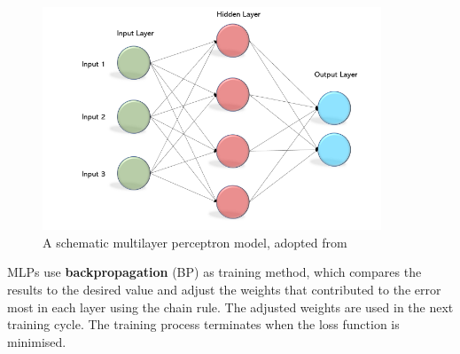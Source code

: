 \documentclass[nobib]{tufte-handout}
\begin{document}
\begin{figure}[h!]
\centering
  \includegraphics[width=0.9\textwidth]{mlp3.png}
  \caption{A schematic multilayer perceptron model, adopted from \cite{becominghuman:MLP}}
  \label{fig:mlp}
\end{figure}
\newpage
MLPs use \textbf{backpropagation} (BP) as training method, which compares the results to the desired value and adjust the weights that contributed to the error most in each layer using the chain rule. The adjusted weights are used in the next training cycle. The training process terminates when the loss function is minimised.
\end{document}
